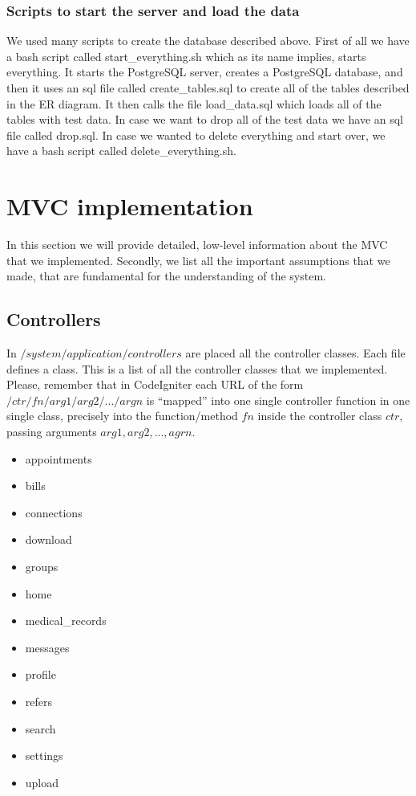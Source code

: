 \subsubsection{Scripts to start the server and load the data}
We used many scripts to create the database described above.  First of all we have a bash script called start\_everything.sh which as its name implies, starts everything.  It starts the PostgreSQL server, creates a PostgreSQL database, and then it uses an sql file called create\_tables.sql to create all of the tables described in the ER diagram.  It then calls the file load\_data.sql which loads all of the tables with test data.  In case we want to drop all of the test data we have an sql file called drop.sql.  In case we wanted to delete everything and start over, we have a bash script called delete\_everything.sh. 






\section{MVC implementation}
\label{sec:mvcimplement}
In this section we will provide detailed, low-level information about the MVC that we implemented. Secondly, we list all the important assumptions that we made, that are fundamental for the understanding of the system.


\subsection{Controllers}
In $/system/application/controllers$ are placed all the controller classes. Each file defines a class. This is a list of all the controller classes that we implemented. Please, remember that in CodeIgniter each URL of the form $/ctr/fn/arg1/arg2/.../argn$ is ``mapped'' into one single controller function in one single class, precisely into the function/method $fn$ inside the controller class $ctr$, passing arguments $arg1, arg2, ..., agrn$.

\begin{itemize}
\item appointments
\item bills
\item connections
\item download
\item groups
\item home
\item medical\_records
\item messages
\item profile
\item refers
\item search
\item settings
\item upload
\end{itemize}

